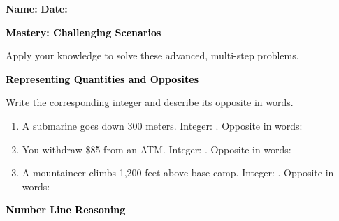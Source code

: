 \documentclass[12pt, letterpaper, fleqn]{article}
\newcommand{\blank}{\underline{\hspace{2.2cm}}}
\newcommand{\blanklong}{\underline{\hspace{6.5cm}}}
\begin{document}
\textbf{Name:} \underline{\hspace{5cm}}
\hfill
\textbf{Date:} \underline{\hspace{3cm}}\\

\begin{tcolorbox}[colback=black!10]
    \large\textcolor{black}{\textbf{Mastery: Challenging Scenarios}}
\end{tcolorbox}

\vspace{3mm}
\noindent
Apply your knowledge to solve these advanced, multi-step problems.

\vspace{4mm}

\begin{tcolorbox}[colback=black!10]
\large\textcolor{black}{\textbf{Representing Quantities and Opposites}}
\end{tcolorbox}

\noindent
Write the corresponding integer and describe its opposite in words.

\vspace{3mm}
\begin{enumerate}[itemsep=2.2cm, leftmargin=0.6cm]
\item A submarine goes down 300 meters. Integer: \blank. Opposite in words: \blanklong

\vspace{2cm}

\item You withdraw \$85 from an ATM. Integer: \blank. Opposite in words: \blanklong

\vspace{2cm}

\item A mountaineer climbs 1,200 feet above base camp. Integer: \blank. Opposite in words: \blanklong

\vspace{2cm}

\end{enumerate}

\newpage

\begin{tcolorbox}[colback=black!10]
\large\textcolor{black}{\textbf{Number Line Reasoning}}
\end{tcolorbox}
\end{document}

